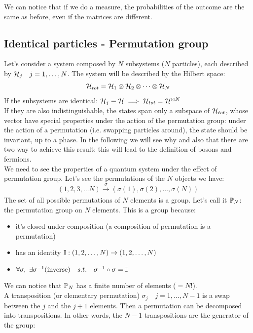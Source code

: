 We can notice that if we do a measure, the probabilities of the outcome are the same as before, even if the matrices are different.


\subsection{Identical particles - Permutation group}
Let's consider a system composed by $N$ subsystems ($N$ particles), each described by $\mathcal{H}_j \quad j = 1,\dots,N$. The system will be described by the Hilbert space: $$\mathcal{H}_{tot} = \mathcal{H}_1 \otimes \mathcal{H}_2 \otimes\dots \otimes \mathcal{H}_N$$
If the subsystems are identical: $\mathcal{H}_j \equiv \mathcal{H} \implies \mathcal{H}_{tot} = \mathcal{H}^{\otimes N}$\\
If they are also indistinguishable, the states span only a subspace of $\mathcal{H}_{tot}$, whose vector have special properties under the action of the permutation group: under the action of a permutation (i.e. swapping particles around), the state should be invariant, up to a phase. In the following we will see why and also that there are two way to achieve this result: this will lead to the definition of bosons and fermions.\\

We need to see the properties of a quantum system under the effect of permutation group. Let's see the permutations of the $N$ objects we have: $$ (1,2,3, \dots N) \xrightarrow[]{\sigma}(\sigma(1), \sigma(2) , \dots, \sigma(N))$$
The set of all possible permutations of $N$ elements is a group. Let's call it $\mathbb{P}_N$: the permutation group on $N$ elements. This is a group because:
\begin{itemize}
    \item it's closed under composition (a composition of permutation is a permutation)
    \item has an identity $\mathbb{I} : (1,2, \dots, N) \to (1,2, \dots, N)$
    \item $\forall \sigma, \ \exists \sigma^{-1} \text{(inverse)} \quad s.t. \quad \sigma^{-1}\circ \sigma = \mathbb{I}$
\end{itemize}
We can notice that $\mathbb{P}_N$ has a finite number of elements ($=N!$).\\

A transposition (or elementary permutation) $\sigma_j \quad j = 1,\dots, N-1$ is a swap between the $j$ and the $j+1$ elements. Then a permutation can be decomposed into transpositions. In other words, the $N-1$ transpositions are the generator of the group:

